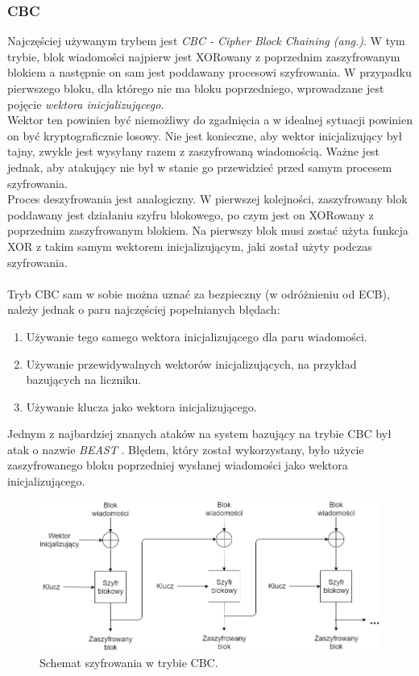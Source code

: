 \subsubsection{CBC}
Najczęściej używanym trybem jest \textit{CBC - Cipher Block Chaining (ang.)}. 
W tym trybie, blok wiadomości najpierw jest XORowany z poprzednim zaszyfrowanym blokiem a następnie
on sam jest poddawany procesowi szyfrowania. W przypadku pierwszego bloku, dla którego nie ma bloku poprzedniego, 
wprowadzane jest pojęcie \textit{wektora inicjalizującego}. \\ 
Wektor ten powinien być niemożliwy do zgadnięcia a w idealnej sytuacji powinien on być kryptograficznie losowy. Nie jest konieczne, aby wektor inicjalizujący był tajny, zwykle jest wysyłany razem z zaszyfrowaną wiadomością. Ważne jest jednak, aby atakujący nie był w stanie go przewidzieć przed samym procesem szyfrowania. \\ 
Proces deszyfrowania jest analogiczny. W pierwszej kolejności, zaszyfrowany blok poddawany jest działaniu szyfru 
blokowego, po czym jest on XORowany z poprzednim zaszyfrowanym blokiem. Na pierwszy blok musi zostać użyta funkcja XOR
z takim samym wektorem inicjalizującym, jaki został użyty podczas szyfrowania. \\\\
Tryb CBC sam w sobie można uznać za bezpieczny (w odróżnieniu od ECB), 
należy jednak o paru najczęściej popełnianych błędach:
\begin{enumerate}
	\item Używanie tego samego wektora inicjalizującego dla paru wiadomości.
	\item Używanie przewidywalnych wektorów inicjalizujących, na przykład bazujących na liczniku.
	\item Używanie klucza jako wektora inicjalizującego. 
\end{enumerate}
Jednym z najbardziej znanych ataków na system bazujący na trybie CBC był atak o nazwie \textit{BEAST} \cite{beast}. 
Błędem, który został wykorzystany, było użycie zaszyfrowanego bloku poprzedniej wysłanej wiadomości jako wektora inicjalizującego.
\begin{figure}
    \centering
	\includegraphics[width=\textwidth]{content/images/cbc-enc-scheme}
    \caption{Schemat szyfrowania w trybie CBC.}
\end{figure}
